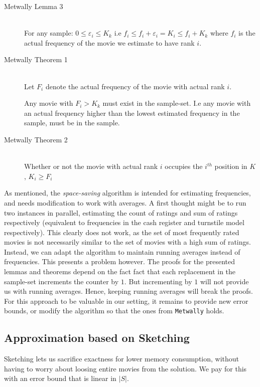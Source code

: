 {\begin{description}
\item[Metwally Lemma 3] \hfill \\
	For any sample: $0 \leq \varepsilon_i \leq K_k$ i.e $f_i \leq f_i
	+ \varepsilon_i = K_i \leq f_i+K_k$ where $f_i$ is the actual frequency
	of the movie we estimate to have rank $i$.

\item[Metwally Theorem 1] \hfill \\
	Let $F_i$ denote the actual frequency of the movie with actual rank $i$.

	Any movie with $F_i > K_k$ must exist in the sample-set. I.e any movie
	with an actual frequency higher than the lowest estimated frequency in
	the sample, must be in the sample.

\item[Metwally Theorem 2] \hfill \\
	Whether or not the movie with actual rank $i$ occupies the $i^{th}$
	position in $K$, $K_i \geq F_i$

\end{description}

As mentioned, the \textit{space-saving} algorithm is intended for
estimating frequencies, and needs modification to work with averages. A first
thought might be to run two instances in parallel, estimating the count of
ratings and sum of ratings respectively (equivalent to frequencies in the cash
register and turnstile model respectively). This clearly does not work, as the
set of most frequently rated movies is not necessarily similar to the set of
movies with a high sum of ratings. Instead, we can adapt the algorithm to
maintain running averages instead of frequencies. This presents a problem
however. The proofs for the presented lemmas and theorems depend on the fact
fact that each replacement in the sample-set increments the counter by $1$. But
incrementing by $1$ will not provide us with running averages. Hence, keeping
running averages will break the proofs. For this approach to be valuable in our
setting, it remains to provide new error bounds, or modify the algorithm so that
the ones from \texttt{Metwally} holds.

\subsection{Approximation based on Sketching}
\label{sec:sketching}

Sketching lets us sacrifice exactness for lower memory consumption, without
having to worry about loosing entire movies from the solution. We pay for this
with an error bound that is linear in $|S|$.

}
